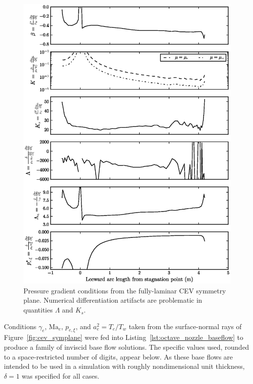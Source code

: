 \documentclass[letterpaper,11pt,nointlimits,reqno]{amsart}
\newcommand{\Mach}[1][]{\ensuremath{\mbox{Ma}_{#1}}}
\begin{document}
\begin{figure}[p]
  \centering
  \includegraphics[]{cev_summary_fpg}
  \caption{
    \label{fig:cev_summary_fpg}
    Pressure gradient conditions from the fully-laminar CEV symmetry plane.
    Numerical differentiation artifacts are problematic in quantities $\Lambda$
    and $K_s$.
  }
\end{figure}

Conditions $\gamma_e$, $\Mach[e]{}$, $p_{e,\xi}$, and $a^2_e = T_e/T_w$ taken
from the surface-normal rays of Figure~\ref{fig:cev_symplane} were fed into
Listing~\ref{lst:octave_nozzle_baseflow} to produce a family of inviscid base
flow solutions.  The specific values used, rounded to a space-restricted number
of digits, appear below.  As these base flows are intended to be used in a
simulation with roughly nondimensional unit thickness, $\delta=1$ was specified
for all cases.
\end{document}
